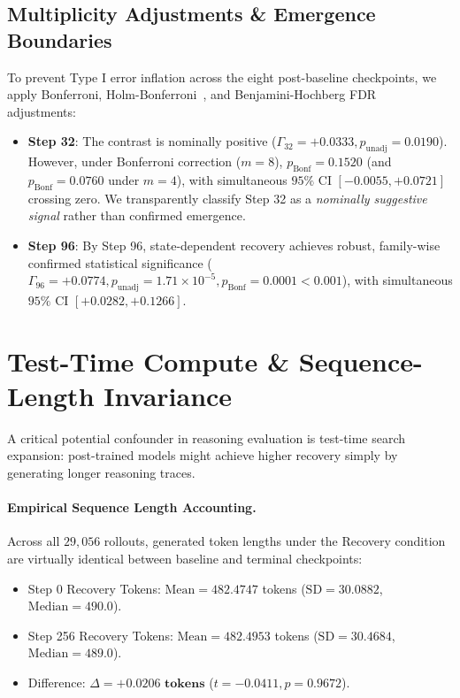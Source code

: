 \documentclass[11pt]{article}
\begin{document}
\subsection{Multiplicity Adjustments \& Emergence Boundaries}
To prevent Type I error inflation across the eight post-baseline checkpoints, we apply Bonferroni, Holm-Bonferroni~\cite{Holm1979Simple}, and Benjamini-Hochberg FDR~\cite{Benjamini1995Controlling} adjustments:
\begin{itemize}
    \item \textbf{Step 32}: The contrast is nominally positive ($\Gamma_{32} = +0.0333, p_{\text{unadj}} = 0.0190$). However, under Bonferroni correction ($m=8$), $p_{\text{Bonf}} = 0.1520$ (and $p_{\text{Bonf}} = 0.0760$ under $m=4$), with simultaneous $95\%$ CI $[-0.0055, +0.0721]$ crossing zero. We transparently classify Step 32 as a \emph{nominally suggestive signal} rather than confirmed emergence.
    \item \textbf{Step 96}: By Step 96, state-dependent recovery achieves robust, family-wise confirmed statistical significance ($\Gamma_{96} = +0.0774, p_{\text{unadj}} = 1.71 \times 10^{-5}, p_{\text{Bonf}} = 0.0001 < 0.001$), with simultaneous $95\%$ CI $[+0.0282, +0.1266]$.
\end{itemize}

\section{Test-Time Compute \& Sequence-Length Invariance}

A critical potential confounder in reasoning evaluation is test-time search expansion: post-trained models might achieve higher recovery simply by generating longer reasoning traces.

\paragraph{Empirical Sequence Length Accounting.}
Across all $29,056$ rollouts, generated token lengths under the Recovery condition are virtually identical between baseline and terminal checkpoints:
\begin{itemize}
    \item Step 0 Recovery Tokens: $\text{Mean} = 482.4747$ tokens ($\text{SD} = 30.0882$, $\text{Median} = 490.0$).
    \item Step 256 Recovery Tokens: $\text{Mean} = 482.4953$ tokens ($\text{SD} = 30.4684$, $\text{Median} = 489.0$).
    \item Difference: $\Delta = \mathbf{+0.0206\text{ tokens}}$ ($t = -0.0411, p = 0.9672$).
\end{itemize}
\end{document}
